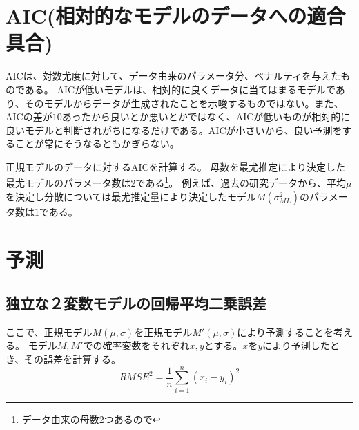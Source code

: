 \section{AIC(相対的なモデルのデータへの適合具合)}
AICは、対数尤度に対して、データ由来のパラメータ分、ペナルティを与えたものである。
AICが低いモデルは、相対的に良くデータに当てはまるモデルであり、そのモデルからデータが生成されたことを示唆するものではない。また、AICの差が$10$あったから良いとか悪いとかではなく、AICが低いものが相対的に良いモデルと判断されがちになるだけである。AICが小さいから、良い予測をすることが常にそうなるともかぎらない。

正規モデルのデータに対するAICを計算する。
母数を最尤推定により決定した最尤モデルのパラメータ数は2である\footnote{データ由来の母数2つあるので}。
例えば、過去の研究データから、平均$\mu$を決定し分散については最尤推定量により決定したモデル$M(\sigma^2_{ML})$のパラメータ数は$1$である。



\section{予測}

\subsection{独立な２変数モデルの回帰平均二乗誤差}\label{null_model}
ここで、正規モデル$M(\mu,\sigma)$を正規モデル$M'(\mu,\sigma)$により予測することを考える。
モデル$M,M'$での確率変数をそれぞれ$x,y$とする。$x$を$y$により予測したとき、その誤差を計算する。
\begin{equation*}
 RMSE^2 = \frac{1}{n}\sum_{i=1}^n (x_i-y_i)^2
\end{equation*}

